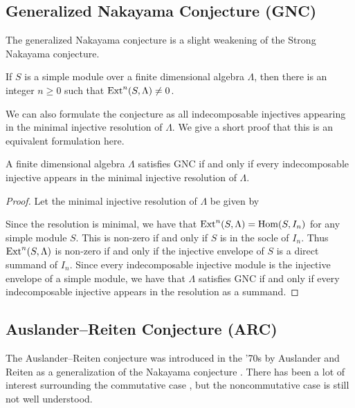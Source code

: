 \subsection*{Generalized Nakayama Conjecture (GNC)}
The generalized Nakayama conjecture is a slight weakening of the Strong Nakayama conjecture.

\begin{conj} 
	If $S$ is a simple module over a finite dimensional algebra $\Lambda$, then there is an integer $n \geq 0$ such that $\operatorname{Ext}^n(S, \Lambda) \neq 0$. 
\end{conj}

We can also formulate the conjecture as all indecomposable injectives appearing in the minimal injective resolution of $\Lambda$. We give a short proof that this is an equivalent formulation here.

\begin{prop}\label{prop:GNC_reformulated}
	A finite dimensional algebra $\Lambda$ satisfies GNC if and only if every indecomposable injective appears in the minimal injective resolution of $\Lambda$.
	\begin{proof}
		Let the minimal injective resolution of $\Lambda$ be given by 
		\begin{center}
		\end{center}
		Since the resolution is minimal, we have that $\operatorname{Ext}^n(S, \Lambda) = \operatorname{Hom}(S, I_n)$ for any simple module $S$. This is non-zero if and only if $S$ is in the socle of $I_n$. Thus $\operatorname{Ext}^n(S, \Lambda)$ is non-zero if and only if the injective envelope of $S$ is a direct summand of $I_n$. Since every indecomposable injective module is the injective envelope of a simple module, we have that $\Lambda$ satisfies GNC if and only if every indecomposable injective appears in the resolution as a summand.
	\end{proof}
\end{prop}

\subsection*{Auslander--Reiten Conjecture (ARC)}

The Auslander--Reiten conjecture was introduced in the '70s by Auslander and Reiten as a generalization of the Nakayama conjecture \cite{AR75}. There has been a lot of interest surrounding the commutative case \cite{ADSS93,CH10,CT13,HL04,HS04,Jorg08}, but the noncommutative case is still not well understood.

